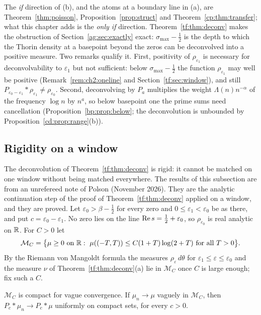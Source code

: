 The \emph{if} direction of (b), and the atoms at a boundary line in (a), are Theorem~\ref{thm:poisson}, Proposition~\ref{prop:struct} and Theorem~\ref{cp:thm:transfer}; what this chapter adds is the \emph{only if} direction. Theorem~\ref{tf:thm:deconv} makes the obstruction of Section~\ref{ag:sec:exactly} exact: $\sigma_{\max}-\tfrac12$ is the depth to which the Thorin density at a basepoint beyond the zeros can be deconvolved into a positive measure. Two remarks qualify it. First, positivity of $\rho_{\varepsilon_1}$ is necessary for deconvolvability to $\varepsilon_1$ but not sufficient: below $\sigma_{\max}-\tfrac12$ the function $\rho_{\varepsilon_1}$ may well be positive (Remark~\ref{rem:ch2:oneline} and Section~\ref{tf:sec:window}), and still $P_{\varepsilon_0-\varepsilon_1}*\rho_{\varepsilon_1}\ne\rho_{\varepsilon_0}$. Second, deconvolving by $P_a$ multiplies the weight $\Lambda(n)n^{-\alpha}$ of the frequency $\log n$ by $n^{a}$, so below basepoint one the prime sums need cancellation (Proposition~\ref{bp:prop:below}; the deconvolution is unbounded by Proposition~\ref{cd:prop:range}(b)).

\subsection{Rigidity on a window}\label{tf:sec:rigid}

The deconvolution of Theorem~\ref{tf:thm:deconv} is rigid: it cannot be matched on one window without being matched everywhere. The results of this subsection are from an unrefereed note of Polson (November 2026). They are the analytic continuation step of the proof of Theorem~\ref{tf:thm:deconv} applied on a window, and they are proved. Let $\varepsilon_0>\beta-\tfrac12$ for every zero and $0\le\varepsilon_1<\varepsilon_0$ be as there, and put $c=\varepsilon_0-\varepsilon_1$. No zero lies on the line $\operatorname{Re} s=\tfrac12+\varepsilon_0$, so $\rho_{\varepsilon_0}$ is real analytic on $\mathbb{R}$. For $C>0$ let
\[
\mathcal M_C=\bigl\{\mu\ge0\text{ on }\mathbb{R}:\ \mu((-T,T))\le C(1+T)\log(2+T)\ \text{for all }T>0\bigr\}.
\]
By the Riemann von Mangoldt formula the measures $\rho_\varepsilon\,d\theta$ for $\varepsilon_1\le\varepsilon\le\varepsilon_0$ and the measure $\nu$ of Theorem~\ref{tf:thm:deconv}(a) lie in $\mathcal M_C$ once $C$ is large enough; fix such a $C$.

\begin{lemma}[Compactness]\label{tf:lem:compact}
$\mathcal M_C$ is compact for vague convergence. If $\mu_n\to\mu$ vaguely in $\mathcal M_C$, then $P_c*\mu_n\to P_c*\mu$ uniformly on compact sets, for every $c>0$.
\end{lemma}

